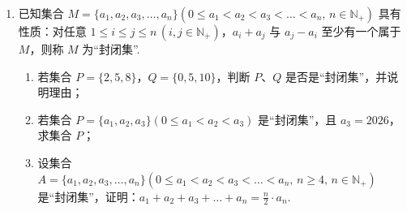 \documentclass[a4paper,11pt]{article}
\begin{document}
\begin{enumerate}
\fi
\ansspace[12]
\ansneed{7cm}
\item 已知集合 $M=\{a_1,a_2,a_3,\dots,a_n\}(0\leqslant a_1<a_2<a_3<\dots<a_n,\,n\in\mathbb{N}_+)$ 具有性质：对任意 $1\leqslant i\leqslant j\leqslant n\,(i,j\in\mathbb{N}_+)$，$a_i+a_j$ 与 $a_j-a_i$ 至少有一个属于 $M$，则称 $M$ 为“封闭集”.
\begin{enumerate}[label=(\arabic*)]
\item 若集合 $P=\{2,5,8\}$，$Q=\{0,5,10\}$，判断 $P$、$Q$ 是否是“封闭集”，并说明理由；
\item 若集合 $P=\{a_1,a_2,a_3\}(0\leqslant a_1<a_2<a_3)$ 是“封闭集”，且 $a_3=2026$，求集合 $P$；
\item 设集合 $A=\{a_1,a_2,a_3,\dots,a_n\}(0\leqslant a_1<a_2<a_3<\dots<a_n,\,n\geqslant 4,\,n\in\mathbb{N}_+)$ 是“封闭集”，证明：$a_1+a_2+a_3+\dots+a_n=\tfrac{n}{2}\cdot a_n$.
\end{enumerate}



\end{enumerate}
\end{document}
